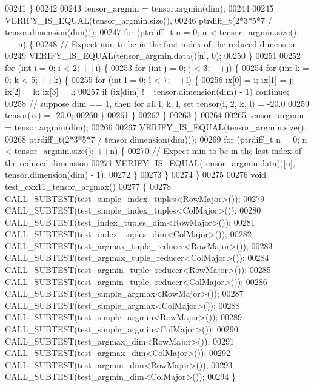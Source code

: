 \begin{DoxyCode}
00241     \}
00242 
00243     tensor\_argmin = tensor.argmin(dim);
00244 
00245     VERIFY\_IS\_EQUAL(tensor\_argmin.size(),
00246                     ptrdiff\_t(2*3*5*7 / tensor.dimension(dim)));
00247     \textcolor{keywordflow}{for} (ptrdiff\_t n = 0; n < tensor\_argmin.size(); ++n) \{
00248       \textcolor{comment}{// Expect min to be in the first index of the reduced dimension}
00249       VERIFY\_IS\_EQUAL(tensor\_argmin.data()[n], 0);
00250     \}
00251 
00252     \textcolor{keywordflow}{for} (\textcolor{keywordtype}{int} i = 0; i < 2; ++i) \{
00253       \textcolor{keywordflow}{for} (\textcolor{keywordtype}{int} j = 0; j < 3; ++j) \{
00254         \textcolor{keywordflow}{for} (\textcolor{keywordtype}{int} k = 0; k < 5; ++k) \{
00255           \textcolor{keywordflow}{for} (\textcolor{keywordtype}{int} l = 0; l < 7; ++l) \{
00256             ix[0] = i; ix[1] = j; ix[2] = k; ix[3] = l;
00257             \textcolor{keywordflow}{if} (ix[dim] != tensor.dimension(dim) - 1) \textcolor{keywordflow}{continue};
00258             \textcolor{comment}{// suppose dim == 1, then for all i, k, l, set tensor(i, 2, k, l) = -20.0}
00259             tensor(ix) = -20.0;
00260           \}
00261         \}
00262       \}
00263     \}
00264 
00265     tensor\_argmin = tensor.argmin(dim);
00266 
00267     VERIFY\_IS\_EQUAL(tensor\_argmin.size(),
00268                     ptrdiff\_t(2*3*5*7 / tensor.dimension(dim)));
00269     \textcolor{keywordflow}{for} (ptrdiff\_t n = 0; n < tensor\_argmin.size(); ++n) \{
00270       \textcolor{comment}{// Expect min to be in the last index of the reduced dimension}
00271       VERIFY\_IS\_EQUAL(tensor\_argmin.data()[n], tensor.dimension(dim) - 1);
00272     \}
00273   \}
00274 \}
00275 
00276 \textcolor{keywordtype}{void} test\_cxx11\_tensor\_argmax()
00277 \{
00278   CALL\_SUBTEST(test\_simple\_index\_tuples<RowMajor>());
00279   CALL\_SUBTEST(test\_simple\_index\_tuples<ColMajor>());
00280   CALL\_SUBTEST(test\_index\_tuples\_dim<RowMajor>());
00281   CALL\_SUBTEST(test\_index\_tuples\_dim<ColMajor>());
00282   CALL\_SUBTEST(test\_argmax\_tuple\_reducer<RowMajor>());
00283   CALL\_SUBTEST(test\_argmax\_tuple\_reducer<ColMajor>());
00284   CALL\_SUBTEST(test\_argmin\_tuple\_reducer<RowMajor>());
00285   CALL\_SUBTEST(test\_argmin\_tuple\_reducer<ColMajor>());
00286   CALL\_SUBTEST(test\_simple\_argmax<RowMajor>());
00287   CALL\_SUBTEST(test\_simple\_argmax<ColMajor>());
00288   CALL\_SUBTEST(test\_simple\_argmin<RowMajor>());
00289   CALL\_SUBTEST(test\_simple\_argmin<ColMajor>());
00290   CALL\_SUBTEST(test\_argmax\_dim<RowMajor>());
00291   CALL\_SUBTEST(test\_argmax\_dim<ColMajor>());
00292   CALL\_SUBTEST(test\_argmin\_dim<RowMajor>());
00293   CALL\_SUBTEST(test\_argmin\_dim<ColMajor>());
00294 \}
\end{DoxyCode}

